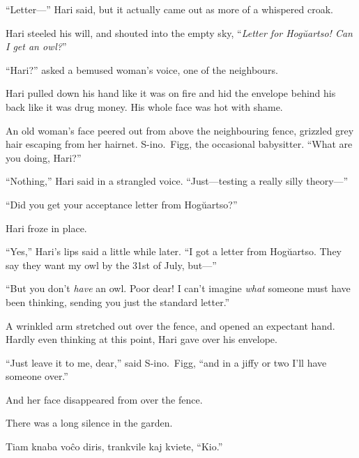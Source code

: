 “Letter—” Hari said, but it actually came out as more of a whispered croak.

Hari steeled his will, and shouted into the empty sky, “\emph{Letter for Hogŭartso! Can I get an owl?}”

“Hari?” asked a bemused woman’s voice, one of the neighbours.

Hari pulled down his hand like it was on fire and hid the envelope behind his back like it was drug money. His whole face was hot with shame.

An old woman’s face peered out from above the neighbouring fence, grizzled grey hair escaping from her hairnet. S\nobreakdash-ino.~Figg, the occasional babysitter. “What are you doing, Hari?”

“Nothing,” Hari said in a strangled voice. “Just—testing a really silly theory—”

“Did you get your acceptance letter from Hogŭartso?”

Hari froze in place.

“Yes,” Hari’s lips said a little while later. “I got a letter from Hogŭartso. They say they want my owl by the 31st of July, but—”

“But you don’t \emph{have} an owl. Poor dear! I can’t imagine \emph{what} someone must have been thinking, sending you just the standard letter.”

A wrinkled arm stretched out over the fence, and opened an expectant hand. Hardly even thinking at this point, Hari gave over his envelope.

“Just leave it to me, dear,” said S\nobreakdash-ino.~Figg, “and in a jiffy or two I’ll have someone over.”

And her face disappeared from over the fence.

There was a long silence in the garden.

Tiam knaba voĉo diris, trankvile kaj kviete, “Kio.”
